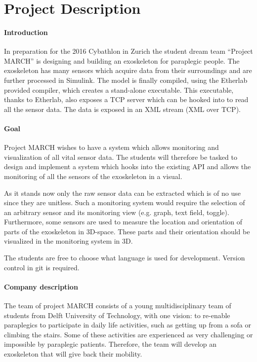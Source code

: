 \chapter{Project Description}
\subsubsection{Introduction}
In preparation for the 2016 Cybathlon in Zurich the student dream team ``Project MARCH'' is designing and building an exoskeleton for paraplegic people. The exoskeleton has many sensors which acquire data from their surroundings and are further processed in Simulink. The model is finally compiled, using the Etherlab provided compiler, which creates a stand-alone executable. This executable, thanks to Etherlab, also exposes a TCP server which can be hooked into to read all the sensor data. The data is exposed in an XML stream (XML over TCP).

\subsubsection{Goal}
Project MARCH wishes to have a system which allows monitoring and visualization of all vital sensor data. The students will therefore be tasked to design and implement a system which hooks into the existing API and allows the monitoring of all the sensors of the exoskeleton in a visual.

As it stands now only the raw sensor data can be extracted which is of no use since they are unitless. Such a monitoring system would require the selection of an arbitrary sensor and its monitoring view (e.g. graph, text field, toggle). Furthermore, some sensors are used to measure the location and orientation of parts of the exoskeleton in 3D-space. These parts and their orientation should be visualized in the monitoring system in 3D.

The students are free to choose what language is used for development. Version control in git is required.

\subsubsection{Company description}
The team of project MARCH consists of a young multidisciplinary team of students from Delft University of Technology, with one vision: to re-enable paraplegics to participate in daily life activities, such as getting up from a sofa or climbing the stairs. Some of these activities are experienced as very challenging or impossible by paraplegic patients. Therefore, the team will develop an exoskeleton that will give back their mobility.

